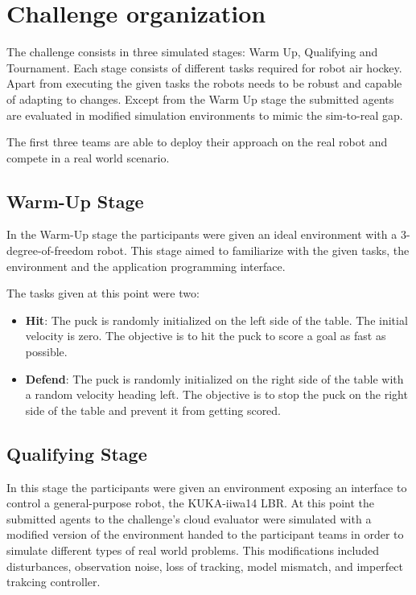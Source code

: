 \section{Challenge organization}
\label{sec:organization}
The challenge consists in three simulated stages: Warm Up, Qualifying and Tournament. Each stage consists of different tasks
required for robot air hockey. Apart from executing the given tasks the robots needs to be robust and capable of adapting to changes.
Except from the Warm Up stage the submitted agents are evaluated in modified simulation environments to mimic the sim-to-real gap.

The first three teams are able to deploy their approach on the real robot and compete in a real world scenario.

\subsection{Warm-Up Stage}
In the Warm-Up stage the participants were given an ideal environment with a 3-degree-of-freedom robot. This stage aimed to familiarize with the given tasks,
the environment and the application programming interface.

The tasks given at this point were two:
\begin{itemize}
    \item \textbf{Hit}: The puck is randomly initialized on the left side of the table. The initial velocity is zero. The objective is to hit the puck
    to score a goal as fast as possible.
    \item \textbf{Defend}: The puck is randomly initialized on the right side of the table with a random velocity heading left.
    The objective is to stop the puck on the right side of the table and prevent it from getting scored.
\end{itemize}
\subsection{Qualifying Stage}
\label{subsec:qualifying_stage}
In this stage the participants were given an environment exposing an interface to control a general-purpose robot, the KUKA-iiwa14 LBR.
At this point the submitted agents to the challenge's cloud evaluator were simulated with a modified version of the environment handed to the participant teams
in order to simulate different types of real world problems. This modifications included disturbances, observation noise, loss of tracking, model mismatch, and imperfect trakcing controller.

